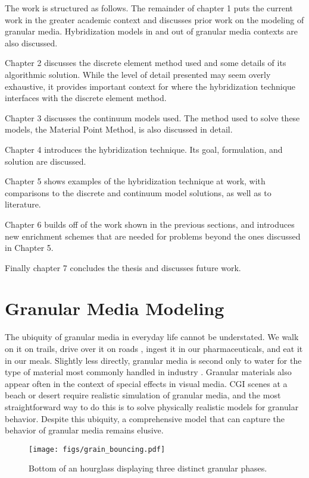 The work is structured as follows. The remainder of chapter 1 puts the current work in the greater academic context and discusses prior work on the modeling of granular media. Hybridization models in and out of granular media contexts are also discussed. 

Chapter 2 discusses the discrete element method used and some details of its algorithmic solution. While the level of detail presented may seem overly exhaustive, it provides important context for where the hybridization technique interfaces with the discrete element method.

Chapter 3 discusses the continuum models used. The method used to solve these models, the Material Point Method, is also discussed in detail.

Chapter 4 introduces the hybridization technique. Its goal, formulation, and solution are discussed.

Chapter 5 shows examples of the hybridization technique at work, with comparisons to the discrete and continuum model solutions, as well as to literature.

Chapter 6 builds off of the work shown in the previous sections, and introduces new enrichment schemes that are needed for problems beyond the ones discussed in Chapter 5.

Finally chapter 7 concludes the thesis and discusses future work. 

\section{Granular Media Modeling}

The ubiquity of granular media in everyday life cannot be understated. We walk on it on trails, drive over it on roads \cite{sullivan06}, ingest it in our pharmaceuticals, and eat it in our meals. Slightly less directly, granular media is second only to water for the type of material most commonly handled in industry \cite{Richard:2005:Slow}. Granular materials also appear often in the context of special effects in visual media. CGI scenes at a beach or desert require realistic simulation of granular media, and the most straightforward way to do this is to solve physically realistic models for granular behavior. Despite this ubiquity, a comprehensive model that can capture the behavior of granular media remains elusive. 

\begin{figure}[htp] 
    \centering
        \texttt{[image: figs/grain\_bouncing.pdf]}
    \caption{Bottom of an hourglass displaying three distinct granular phases.}
    \label{hourglass}
\end{figure}

